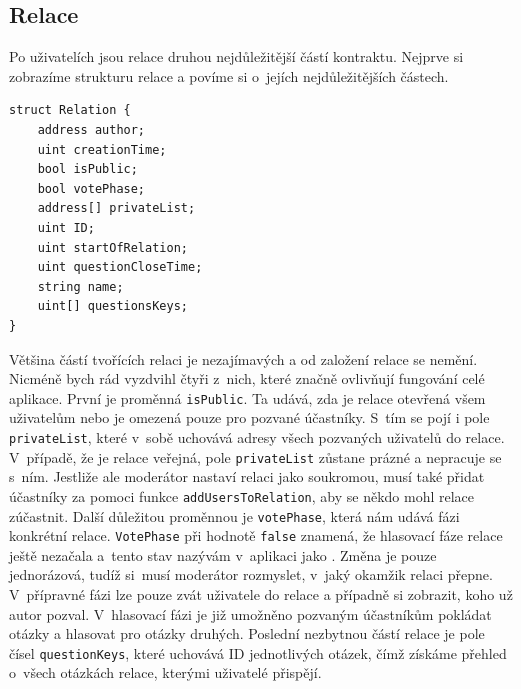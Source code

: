 \subsection{Relace}
Po uživatelích jsou relace druhou nejdůležitější částí kontraktu. Nejprve si zobrazíme strukturu relace a povíme si o~jejích nejdůležitějších částech. 

\begin{verbatim}
struct Relation {
    address author;
    uint creationTime; 
    bool isPublic; 
    bool votePhase; 
    address[] privateList; 
    uint ID;
    uint startOfRelation; 
    uint questionCloseTime; 
    string name; 
    uint[] questionsKeys;
}
\end{verbatim}

Většina částí tvořících relaci je nezajímavých a od založení relace se nemění. Nicméně bych rád vyzdvihl čtyři z~nich, které značně ovlivňují fungování celé aplikace. První je proměnná \texttt{isPublic}. Ta udává, zda je relace otevřená všem uživatelům nebo je omezená pouze pro pozvané účastníky. S~tím se pojí i pole \texttt{privateList}, které v~sobě uchovává adresy všech pozvaných uživatelů do relace. V~případě, že je relace veřejná, pole \texttt{privateList} zůstane prázné a nepracuje se s~ním. Jestliže ale moderátor nastaví relaci jako soukromou, musí také přidat účastníky za pomoci funkce \texttt{addUsersToRelation}, aby se někdo mohl relace zúčastnit. Další důležitou proměnnou je \texttt{votePhase}, která nám udává fázi konkrétní relace. \texttt{VotePhase} při hodnotě \texttt{false} znamená, že hlasovací fáze relace ještě nezačala a~tento stav nazývám v~aplikaci jako . Změna je pouze jednorázová, tudíž si~musí moderátor rozmyslet, v~jaký okamžik relaci přepne. V~přípravné fázi lze pouze zvát uživatele do relace a případně si zobrazit, koho už autor pozval. V~hlasovací fázi je již umožněno pozvaným účastníkům pokládat otázky a hlasovat pro otázky druhých. Poslední nezbytnou částí relace je pole čísel \texttt{questionKeys}, které uchovává ID jednotlivých otázek, čímž získáme přehled o~všech otázkách relace, kterými uživatelé přispějí.


